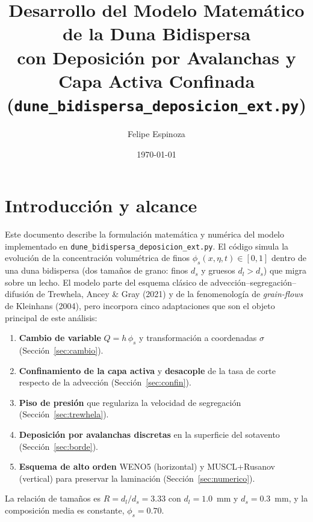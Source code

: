 \documentclass[11pt,a4paper]{article}
\title{\textbf{Desarrollo del Modelo Matemático de la Duna Bidispersa\\[4pt]
con Deposición por Avalanchas y Capa Activa Confinada\\[6pt]
\large (\texttt{dune\_bidispersa\_deposicion\_ext.py})}}
\author{Felipe Espinoza}
\date{\today}
\begin{document}
\maketitle
\tableofcontents
\newpage

\section{Introducción y alcance}
Este documento describe la formulación matemática y numérica del modelo
implementado en \texttt{dune\_bidispersa\_deposicion\_ext.py}. El código
simula la evolución de la concentración volumétrica de finos
$\phi_s(x,\eta,t)\in[0,1]$ dentro de una duna bidispersa (dos tamaños de
grano: finos $d_s$ y gruesos $d_l>d_s$) que migra sobre un lecho. El modelo
parte del esquema clásico de advección--segregación--difusión de Trewhela,
Ancey \& Gray (2021) y de la fenomenología de \emph{grain-flows} de
Kleinhans (2004), pero incorpora cinco adaptaciones que son el objeto
principal de este análisis:
\begin{enumerate}
    \item \textbf{Cambio de variable} $Q=h\,\phi_s$ y transformación a
    coordenadas $\sigma$ (Sección~\ref{sec:cambio}).
    \item \textbf{Confinamiento de la capa activa} y \textbf{desacople} de
    la tasa de corte respecto de la advección (Sección~\ref{sec:confin}).
    \item \textbf{Piso de presión} que regulariza la velocidad de
    segregación (Sección~\ref{sec:trewhela}).
    \item \textbf{Deposición por avalanchas discretas} en la superficie del
    sotavento (Sección~\ref{sec:borde}).
    \item \textbf{Esquema de alto orden} WENO5 (horizontal) y MUSCL+Rusanov
    (vertical) para preservar la laminación (Sección~\ref{sec:numerico}).
\end{enumerate}
La relación de tamaños es $R = d_l/d_s = 3.33$ con $d_l=1.0$~mm y
$d_s=0.3$~mm, y la composición media es constante, $\phi_s=0.70$.

\end{document}

